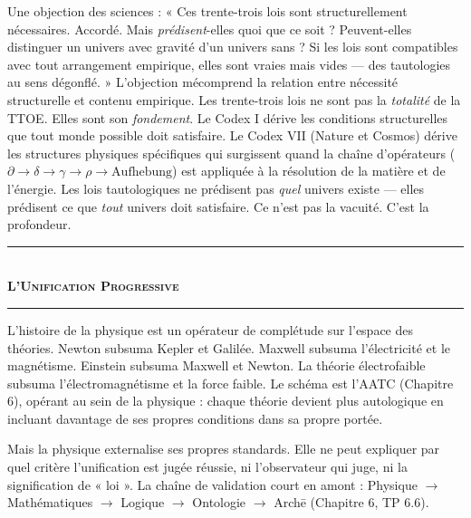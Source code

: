 \documentclass[10pt, openany, oneside]{book}
\renewcommand{\normalsize}{\fontsize{10}{13}\selectfont}
\begin{document}
\vspace{1.5em}

Une objection des sciences : « Ces trente-trois lois sont structurellement nécessaires. Accordé. Mais \textit{prédisent}-elles quoi que ce soit ? Peuvent-elles distinguer un univers avec gravité d'un univers sans ? Si les lois sont compatibles avec tout arrangement empirique, elles sont vraies mais vides --- des tautologies au sens dégonflé. » L'objection mécomprend la relation entre nécessité structurelle et contenu empirique. Les trente-trois lois ne sont pas la \textit{totalité} de la TTOE. Elles sont son \textit{fondement}. Le Codex I dérive les conditions structurelles que tout monde possible doit satisfaire. Le Codex VII (Nature et Cosmos) dérive les structures physiques spécifiques qui surgissent quand la chaîne d'opérateurs ($\partial \to \delta \to \gamma \to \rho \to \text{Aufhebung}$) est appliquée à la résolution de la matière et de l'énergie. Les lois tautologiques ne prédisent pas \textit{quel} univers existe --- elles prédisent ce que \textit{tout} univers doit satisfaire. Ce n'est pas la vacuité. C'est la profondeur.

\begin{center}
    \rule{0.3\textwidth}{0.4pt}\\[0.5em]
    {\normalsize\bfseries\scshape L'Unification Progressive}\\[0.3em]
    \rule{0.3\textwidth}{0.4pt}
\end{center}

\vspace{1em}

\noindent L'histoire de la physique est un opérateur de complétude sur l'espace des théories. Newton subsuma Kepler et Galilée. Maxwell subsuma l'électricité et le magnétisme. Einstein subsuma Maxwell et Newton. La théorie électrofaible subsuma l'électromagnétisme et la force faible. Le schéma est l'AATC (Chapitre 6), opérant au sein de la physique : chaque théorie devient plus autologique en incluant davantage de ses propres conditions dans sa propre portée.

Mais la physique externalise ses propres standards. Elle ne peut expliquer par quel critère l'unification est jugée réussie, ni l'observateur qui juge, ni la signification de « loi ». La chaîne de validation court en amont : Physique $\to$ Mathématiques $\to$ Logique $\to$ Ontologie $\to$ Arch\={e} (Chapitre 6, TP 6.6).

\vspace{1.5em}
\end{document}

